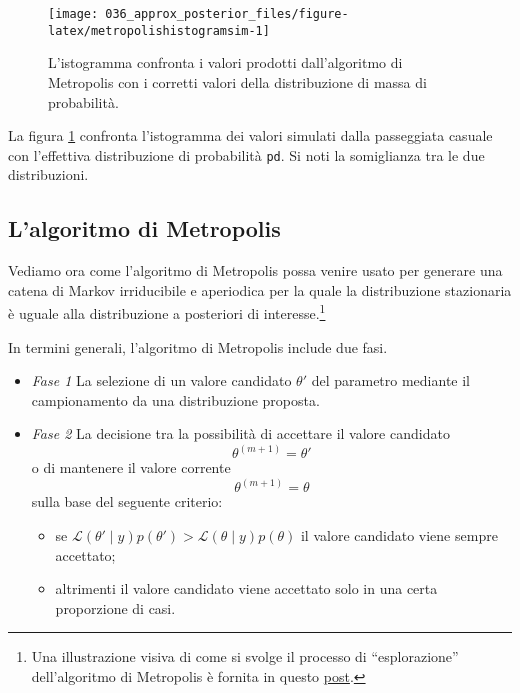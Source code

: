 \documentclass[
]{memoir}
\providecommand{\tightlist}{%
  \setlength{\itemsep}{0pt}\setlength{\parskip}{0pt}}
\begin{document}
\begin{figure}

{\centering \texttt{[image: 036\_approx\_posterior\_files/figure-latex/metropolishistogramsim-1]} 

}

\caption{L'istogramma confronta i valori prodotti dall'algoritmo di Metropolis con i corretti valori della distribuzione di massa di probabilità.}\label{fig:metropolishistogramsim}
\end{figure}

\noindent
La figura \ref{fig:metropolishistogramsim} confronta l'istogramma dei valori simulati dalla passeggiata casuale con l'effettiva distribuzione di probabilità \texttt{pd}. Si noti la somiglianza tra le due distribuzioni.

\hypertarget{lalgoritmo-di-metropolis}{%
\subsection{L'algoritmo di Metropolis}\label{lalgoritmo-di-metropolis}}

Vediamo ora come l'algoritmo di Metropolis possa venire usato per generare una catena di Markov irriducibile e aperiodica per la quale la distribuzione stazionaria è uguale alla distribuzione a posteriori di interesse.\footnote{Una illustrazione visiva di come si svolge il processo di ``esplorazione'' dell'algoritmo di Metropolis è fornita in questo \href{https://elevanth.org/blog/2017/11/28/build-a-better-markov-chain/}{post}.}

In termini generali, l'algoritmo di Metropolis include due fasi.

\begin{itemize}
\tightlist
\item
  \emph{Fase 1} La selezione di un valore candidato \(\theta'\) del parametro mediante il campionamento da una distribuzione proposta.
\item
  \emph{Fase 2} La decisione tra la possibilità di accettare il valore candidato
  \[
  \theta^{(m+1)} = \theta'
  \]
  \noindent
  o di mantenere il valore corrente
  \[
  \theta^{(m+1)} = \theta
  \]
  \noindent
  sulla base del seguente criterio:

  \begin{itemize}
  \tightlist
  \item
    se \(\mathcal{L}(\theta' \mid y)p(\theta') > \mathcal{L}(\theta \mid y)p(\theta)\) il valore candidato viene sempre accettato;
  \item
    altrimenti il valore candidato viene accettato solo in una certa proporzione di casi.
  \end{itemize}
\end{itemize}
\end{document}
